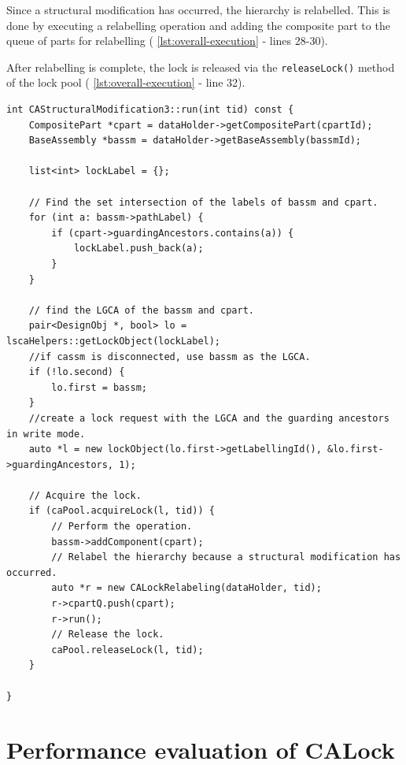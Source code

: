 Since a structural modification has occurred, the hierarchy is relabelled. This is done by executing a relabelling operation and adding the composite part to the queue of parts for relabelling ( \cref{lst:overall-execution} - lines 28-30). 

After relabelling is complete, the lock is released via the \texttt{releaseLock()} method of the lock pool ( \cref{lst:overall-execution} - line 32).


\begin{lstlisting}[caption={Overall execution of an operation in CALock}, label={lst:overall-execution}]
int CAStructuralModification3::run(int tid) const {
    CompositePart *cpart = dataHolder->getCompositePart(cpartId);
    BaseAssembly *bassm = dataHolder->getBaseAssembly(bassmId);

    list<int> lockLabel = {};

    // Find the set intersection of the labels of bassm and cpart.
    for (int a: bassm->pathLabel) {
        if (cpart->guardingAncestors.contains(a)) {
            lockLabel.push_back(a);
        }
    }

    // find the LGCA of the bassm and cpart.
    pair<DesignObj *, bool> lo = lscaHelpers::getLockObject(lockLabel);
    //if cassm is disconnected, use bassm as the LGCA.
    if (!lo.second) {
        lo.first = bassm;
    }
    //create a lock request with the LGCA and the guarding ancestors in write mode. 
    auto *l = new lockObject(lo.first->getLabellingId(), &lo.first->guardingAncestors, 1);

    // Acquire the lock.
    if (caPool.acquireLock(l, tid)) {
        // Perform the operation.
        bassm->addComponent(cpart);
        // Relabel the hierarchy because a structural modification has occurred.
        auto *r = new CALockRelabeling(dataHolder, tid);
        r->cpartQ.push(cpart);
        r->run();
        // Release the lock.
        caPool.releaseLock(l, tid);
    }

}

\end{lstlisting}





\section{Performance evaluation of CALock} \label{chap:evaluation}


